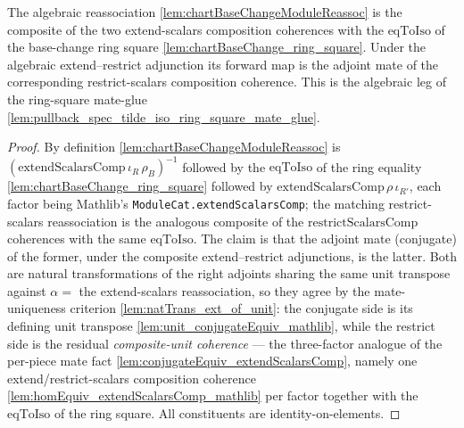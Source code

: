 \begin{lemma}


  \label{lem:chartBaseChangeModuleReassoc_extendScalarsComp}
  The algebraic reassociation \cref{lem:chartBaseChangeModuleReassoc} is the composite of the two
  extend-scalars composition coherences with the \(\mathrm{eqToIso}\) of the base-change ring square
  \cref{lem:chartBaseChange_ring_square}. Under the algebraic extend--restrict adjunction its forward
  map is the adjoint mate of the corresponding restrict-scalars composition coherence. This is the
  algebraic leg of the ring-square mate-glue
  \cref{lem:pullback_spec_tilde_iso_ring_square_mate_glue}.
  \begin{proof}
    By definition \cref{lem:chartBaseChangeModuleReassoc} is
    \((\mathrm{extendScalarsComp}\,\iota_R\,\rho_B)^{-1}\) followed by the \(\mathrm{eqToIso}\) of the
    ring equality \cref{lem:chartBaseChange_ring_square} followed by
    \(\mathrm{extendScalarsComp}\,\rho\,\iota_{R'}\), each factor being Mathlib's
    \texttt{ModuleCat.extendScalarsComp}; the matching restrict-scalars reassociation is the
    analogous composite of the \(\mathrm{restrictScalarsComp}\) coherences with the same
    \(\mathrm{eqToIso}\). The claim is that the adjoint mate (conjugate) of the former, under the
    composite extend--restrict adjunctions, is the latter. Both are natural transformations of the
    right adjoints sharing the same unit transpose against \(\alpha = \) the extend-scalars
    reassociation, so they agree by the mate-uniqueness criterion
    \cref{lem:natTrans_ext_of_unit}: the conjugate side is its defining unit transpose
    \cref{lem:unit_conjugateEquiv_mathlib}, while the restrict side is the residual
    \emph{composite-unit coherence} — the three-factor analogue of the per-piece mate fact
    \cref{lem:conjugateEquiv_extendScalarsComp}, namely one extend/restrict-scalars composition
    coherence \cref{lem:homEquiv_extendScalarsComp_mathlib} per factor together with the
    \(\mathrm{eqToIso}\) of the ring square. All constituents are identity-on-elements.
  \end{proof}
\end{lemma}

